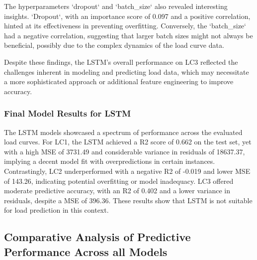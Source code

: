 \documentclass{article} %
\begin{document}
The hyperparameters `dropout` and `batch\_size` also revealed interesting insights. `Dropout`, with an importance score of 0.097 and a positive correlation, hinted at its effectiveness in preventing overfitting. Conversely, the `batch\_size` had a negative correlation, suggesting that larger batch sizes might not always be beneficial, possibly due to the complex dynamics of the load curve data.

Despite these findings, the \gls{LSTM}'s overall performance on \gls{LC3} reflected the challenges inherent in modeling and predicting load data, which may necessitate a more sophisticated approach or additional feature engineering to improve accuracy.

\subsubsection{Final Model Results for LSTM}

The \gls{LSTM} models showcased a spectrum of performance across the evaluated load curves. For \gls{LC1}, the \gls{LSTM} achieved a \gls{R2} score of 0.662 on the test set, yet with a high \gls{MSE} of 3731.49 and considerable variance in residuals of 18637.37, implying a decent model fit with overpredictions in certain instances. Contrastingly, \gls{LC2} underperformed with a negative \gls{R2} of -0.019 and lower \gls{MSE} of 143.26, indicating potential overfitting or model inadequacy. \gls{LC3} offered moderate predictive accuracy, with an \gls{R2} of 0.402 and a lower variance in residuals, despite a \gls{MSE} of 396.36. 
These results show that \gls{LSTM} is not suitable for load prediction in this context.


\subsection{Comparative Analysis of Predictive Performance Across all Models}
\end{document}
